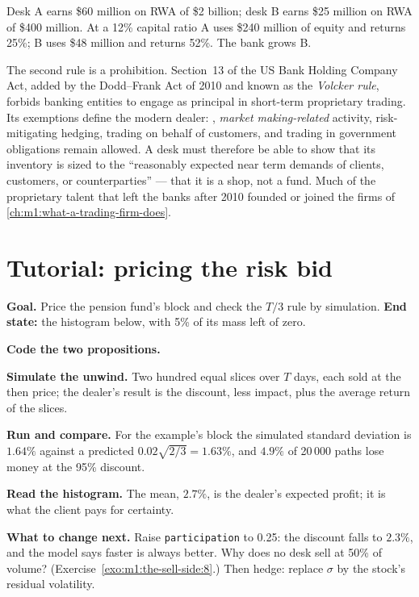 \begin{example}\label{ex:m1:the-sell-side:twodesks}
Desk A earns \$60 million on RWA of \$2 billion; desk B earns \$25 million on
RWA of \$400 million. At a 12\% capital ratio A uses \$240 million of equity
and returns 25\%; B uses \$48 million and returns 52\%. The bank grows B.
\end{example}

The second rule is a prohibition. Section~13 of the US Bank Holding Company
Act, added by the Dodd--Frank Act of 2010 and known as the \emph{Volcker
rule}, forbids banking entities to engage as principal in short-term
proprietary trading. Its exemptions define the modern dealer: ,
\emph{market making-related} activity, risk-mitigating hedging, trading on
behalf of customers, and trading in government obligations remain allowed.
A desk must therefore be able to show that its inventory is sized to
the ``reasonably expected near term demands of clients, customers, or
counterparties'' --- that it is a shop, not a fund. Much of the proprietary talent that left the banks after 2010
founded or joined the firms of \cref{ch:m1:what-a-trading-firm-does}.

\section{Tutorial: pricing the risk bid}\label{tut:m1:the-sell-side:riskbid}

\begin{tutorial}
\textbf{Goal.} Price the pension fund's block and check the $T/3$ rule by
simulation. \textbf{End state:} the histogram below, with 5\% of its mass
left of zero.
\begin{tutsteps}
\item \textbf{Code the two propositions.}
\label{lst:m1:the-sell-side:formulas}
\item \textbf{Simulate the unwind.} Two hundred equal slices over $T$ days,
each sold at the then price; the dealer's result is the discount, less
impact, plus the average return of the slices.
\label{lst:m1:the-sell-side:mc}
\item \textbf{Run and compare.} For the example's block the simulated
standard deviation is $1.64\%$ against a predicted $0.02\sqrt{2/3} =
1.63\%$, and $4.9\%$ of 20\,000 paths lose money at the 95\% discount.
\item \textbf{Read the histogram.} The mean, $2.7\%$, is the dealer's
expected profit; it is what the client pays for certainty.
\end{tutsteps}
\textbf{What to change next.} Raise \texttt{participation} to 0.25: the
discount falls to $2.3\%$, and the model says faster is always better. Why
does no desk sell at 50\% of volume? (Exercise~\ref{exo:m1:the-sell-side:8}.)
Then hedge: replace $\sigma$ by the stock's residual volatility.
\end{tutorial}

